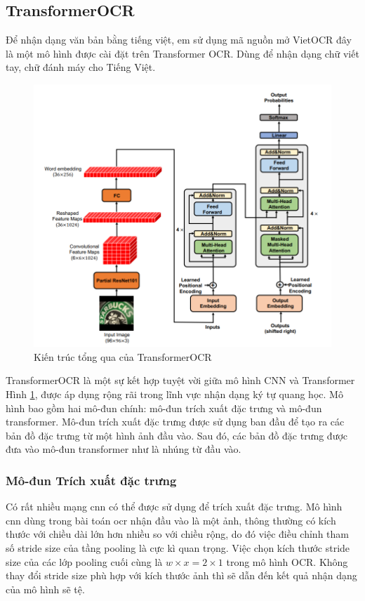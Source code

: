 \subsection{TransformerOCR}
Để nhận dạng văn bản bằng tiếng việt, em sử dụng mã nguồn mở VietOCR đây là một mô hình được cài đặt trên Transformer OCR. Dùng để nhận dạng chữ viết tay, chữ đánh máy cho Tiếng Việt.

\begin{figure}[h]
    \includegraphics[scale=0.65]{images/overview-transOCR.png}
    \centering
    \caption{Kiến trúc tổng qua của TransformerOCR \cite{feng2020scene}}
    \label{overview-transOCR}
\end{figure}

TransformerOCR là một sự kết hợp tuyệt vời giữa mô hình CNN và Transformer Hình \ref{overview-transOCR}, được áp dụng rộng rãi trong lĩnh vực nhận dạng ký tự quang học. Mô hình bao gồm hai mô-đun chính: mô-đun trích xuất đặc trưng và mô-đun transformer. Mô-đun trích xuất đặc trưng được sử dụng ban đầu để tạo ra các bản đồ đặc trưng từ một hình ảnh đầu vào. Sau đó, các bản đồ đặc trưng được đưa vào mô-đun transformer như là nhúng từ đầu vào.

\subsubsection*{Mô-đun Trích xuất đặc trưng}
Có rất nhiều mạng \acrshort*{cnn} có thể được sử dụng để trích xuất đặc trưng. Mô hình \acrshort*{cnn} dùng trong bài toán \acrshort*{ocr} nhận đầu vào là một ảnh, thông thường có kích thước với chiều dài lớn hơn nhiều so với chiều rộng, do đó việc điều chỉnh tham số stride size của tầng pooling là cực kì quan trọng. Việc chọn kích thước stride size của các lớp pooling cuối cùng là $w \times x = 2 \times 1$ trong mô hình OCR. Không thay đổi stride size phù hợp với kích thước ảnh thì sẽ dẫn đến kết quả nhận dạng của mô hình sẽ tệ.


